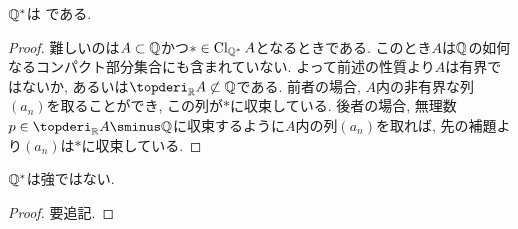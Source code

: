 \documentclass[uplatex, dvipdfmx, a4paper, 12pt]{jsarticle}
\theoremstyle{plain}
\theoremstyle{nonumberplain}
\newtheorem{proof}{証明}
\begin{document}
\begin{property}
	$ \mathbb{Q}^\ast $は \Frechet である.
\end{property}
\begin{proof}
	難しいのは$ A \subset \mathbb{Q} $かつ$ \ast \in \mathop{\mathrm{Cl}}\nolimits_{\mathbb{Q}^\ast} A $となるときである. このとき$ A $は$ \mathbb{Q} $の如何なるコンパクト部分集合にも含まれていない. よって前述の性質より$ A $は有界ではないか, あるいは$ \topderi_{\R} A \not\subset \Q $である. 前者の場合, $ A $内の非有界な列$ (a_n) $を取ることができ, この列が$ \ast $に収束している. 後者の場合, 無理数$ p \in \topderi_{\R} A \sminus \Q $に収束するように$ A $内の列$ (a_n) $を取れば, 先の補題より$ (a_n) $は$ \ast $に収束している.
\end{proof}

\begin{property}
	$ \mathbb{Q}^\ast $は強\Frechet ではない.
\end{property}
\begin{proof}
	要追記.
\end{proof}
\end{document}
